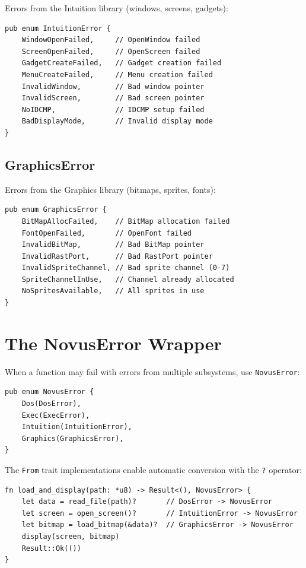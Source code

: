 Errors from the Intuition library (windows, screens, gadgets):

\begin{lstlisting}
pub enum IntuitionError {
    WindowOpenFailed,     // OpenWindow failed
    ScreenOpenFailed,     // OpenScreen failed
    GadgetCreateFailed,   // Gadget creation failed
    MenuCreateFailed,     // Menu creation failed
    InvalidWindow,        // Bad window pointer
    InvalidScreen,        // Bad screen pointer
    NoIDCMP,              // IDCMP setup failed
    BadDisplayMode,       // Invalid display mode
}
\end{lstlisting}

\subsection{GraphicsError}

Errors from the Graphics library (bitmaps, sprites, fonts):

\begin{lstlisting}
pub enum GraphicsError {
    BitMapAllocFailed,    // BitMap allocation failed
    FontOpenFailed,       // OpenFont failed
    InvalidBitMap,        // Bad BitMap pointer
    InvalidRastPort,      // Bad RastPort pointer
    InvalidSpriteChannel, // Bad sprite channel (0-7)
    SpriteChannelInUse,   // Channel already allocated
    NoSpritesAvailable,   // All sprites in use
}
\end{lstlisting}

\section{The NovusError Wrapper}
\label{sec:novus-error}

When a function may fail with errors from multiple subsystems, use \texttt{NovusError}:

\begin{lstlisting}
pub enum NovusError {
    Dos(DosError),
    Exec(ExecError),
    Intuition(IntuitionError),
    Graphics(GraphicsError),
}
\end{lstlisting}

The \texttt{From} trait implementations enable automatic conversion with the \texttt{?} operator:

\begin{lstlisting}
fn load_and_display(path: *u8) -> Result<(), NovusError> {
    let data = read_file(path)?       // DosError -> NovusError
    let screen = open_screen()?       // IntuitionError -> NovusError
    let bitmap = load_bitmap(&data)?  // GraphicsError -> NovusError
    display(screen, bitmap)
    Result::Ok(())
}
\end{lstlisting}


